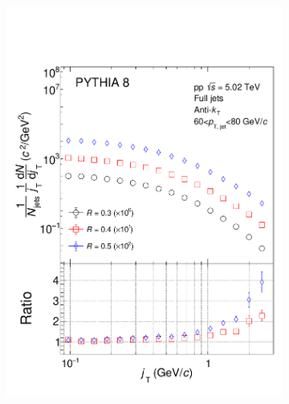 \begin{figure}[hbt!]
  \centering
  \begin{subfigure}{0.48\textwidth}
  \includegraphics[width=\linewidth]{newfigures/RcomparisonJT}
  \caption{}
  \end{subfigure}
  \begin{subfigure}{0.48\textwidth}

\end{subfigure}
\end{figure}
